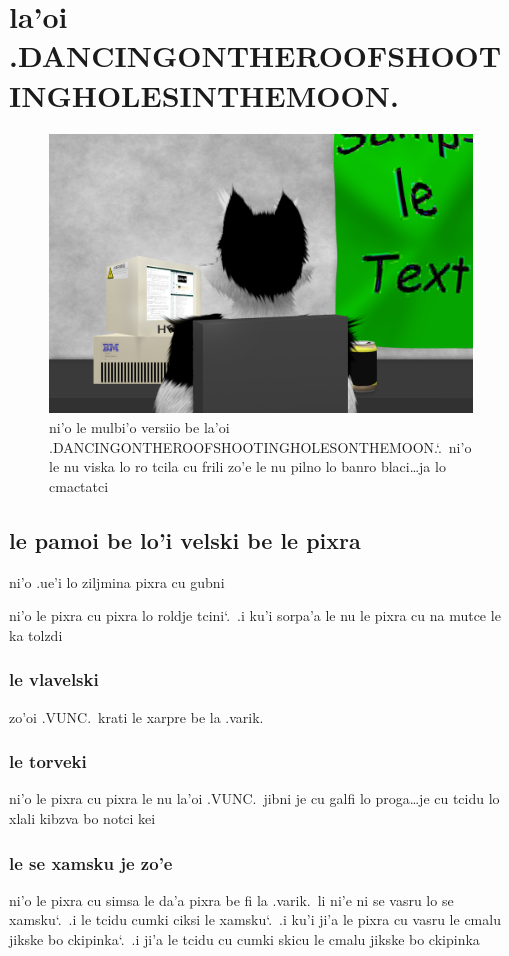 \documentclass{report}
\newcommand\sds{\spacefactor\sfcode`.\ \space}
\begin{document}
\chapter{la'oi .DANCINGONTHEROOFSHOOTINGHOLESINTHEMOON.}
\begin{figure}[ht]
	\centering
	\includegraphics[width=\textwidth]{dancingontheroofshootingholesinthemoon/dancingontheroofshootingholesinthemoon.png}
	\caption[center]{ni'o le mulbi'o versiio be la'oi .DANCINGONTHEROOFSHOOTINGHOLESONTHEMOON.\sds  ni'o le nu viska lo ro tcila cu frili zo'e le nu pilno lo banro blaci\ldots ja lo cmactatci}
\end{figure}
\section{le pamoi be lo'i velski be le pixra}
ni'o .ue'i lo ziljmina pixra cu gubni

ni'o le pixra cu pixra lo roldje tcini\sds  .i ku'i sorpa'a le nu le pixra cu na mutce le ka tolzdi

\subsection{le vlavelski}
zo'oi .VUNC.\ krati le xarpre be la .varik.
\subsection{le torveki}
ni'o le pixra cu pixra le nu la'oi .VUNC.\ jibni je cu galfi lo proga\ldots je cu tcidu lo xlali kibzva bo notci kei

\subsection{le se xamsku je zo'e}
ni'o le pixra cu simsa le da'a pixra be fi la .varik.\ li ni'e ni se vasru lo se xamsku\sds  .i le tcidu cumki ciksi le xamsku\sds  .i ku'i ji'a le pixra cu vasru le cmalu jikske bo ckipinka\sds  .i ji'a le tcidu cu cumki skicu le cmalu jikske bo ckipinka
\end{document}
